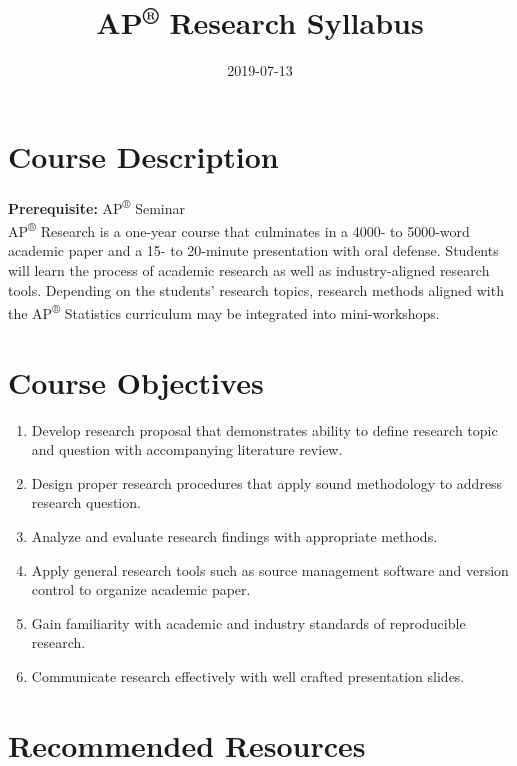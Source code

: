 \documentclass[]{article}
\title{AP\textsuperscript{®} Research Syllabus}
\author{}
\date{2019-07-13}
\providecommand{\tightlist}{%
  \setlength{\itemsep}{0pt}\setlength{\parskip}{0pt}}
\begin{document}
\maketitle

{
\setcounter{tocdepth}{2}
\tableofcontents
}
\hypertarget{course-description}{%
\section{Course Description}\label{course-description}}

\textbf{Prerequisite:} AP\textsuperscript{®} Seminar\\
AP\textsuperscript{®} Research is a one-year course that culminates in a 4000- to 5000-word academic paper and a 15- to 20-minute presentation with oral defense. Students will learn the process of academic research as well as industry-aligned research tools. Depending on the students' research topics, research methods aligned with the AP\textsuperscript{®} Statistics curriculum may be integrated into mini-workshops.

\hypertarget{course-objectives}{%
\section{Course Objectives}\label{course-objectives}}

\begin{enumerate}
\def\labelenumi{\arabic{enumi}.}
\tightlist
\item
  Develop research proposal that demonstrates ability to define research topic and question with accompanying literature review.
\item
  Design proper research procedures that apply sound methodology to address research question.
\item
  Analyze and evaluate research findings with appropriate methods.
\item
  Apply general research tools such as source management software and version control to organize academic paper.
\item
  Gain familiarity with academic and industry standards of reproducible research.
\item
  Communicate research effectively with well crafted presentation slides.
\end{enumerate}

\hypertarget{recommended-resources}{%
\section{Recommended Resources}\label{recommended-resources}}
\end{document}
